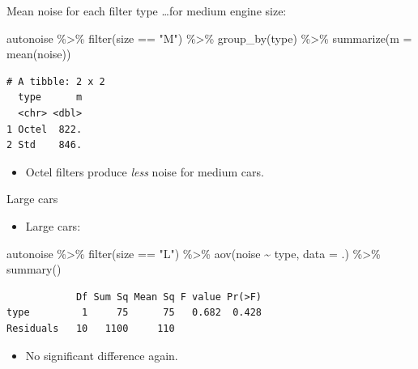 \documentclass[
  ignorenonframetext,
]{beamer}
\newenvironment{Shaded}{\begin{snugshade}}{\end{snugshade}}
\newcommand{\AttributeTok}[1]{\textcolor[rgb]{0.40,0.45,0.13}{#1}}
\newcommand{\FunctionTok}[1]{\textcolor[rgb]{0.28,0.35,0.67}{#1}}
\newcommand{\NormalTok}[1]{\textcolor[rgb]{0.00,0.23,0.31}{#1}}
\newcommand{\SpecialCharTok}[1]{\textcolor[rgb]{0.37,0.37,0.37}{#1}}
\newcommand{\StringTok}[1]{\textcolor[rgb]{0.13,0.47,0.30}{#1}}
\providecommand{\tightlist}{%
  \setlength{\itemsep}{0pt}\setlength{\parskip}{0pt}}\usepackage{longtable,booktabs,array}
\begin{document}
\begin{frame}[fragile]{Mean noise for each filter type}
\protect\hypertarget{mean-noise-for-each-filter-type}{}
\ldots for medium engine size:

\begin{Shaded}
\begin{Highlighting}[]
\NormalTok{autonoise }\SpecialCharTok{\%\textgreater{}\%}
  \FunctionTok{filter}\NormalTok{(size }\SpecialCharTok{==} \StringTok{"M"}\NormalTok{) }\SpecialCharTok{\%\textgreater{}\%}
  \FunctionTok{group\_by}\NormalTok{(type) }\SpecialCharTok{\%\textgreater{}\%}
  \FunctionTok{summarize}\NormalTok{(}\AttributeTok{m =} \FunctionTok{mean}\NormalTok{(noise))}
\end{Highlighting}
\end{Shaded}

\begin{verbatim}
# A tibble: 2 x 2
  type      m
  <chr> <dbl>
1 Octel  822.
2 Std    846.
\end{verbatim}

\begin{itemize}
\tightlist
\item
  Octel filters produce \emph{less} noise for medium cars.
\end{itemize}
\end{frame}

\begin{frame}[fragile]{Large cars}
\protect\hypertarget{large-cars}{}
\begin{itemize}
\tightlist
\item
  Large cars:
\end{itemize}

\begin{Shaded}
\begin{Highlighting}[]
\NormalTok{autonoise }\SpecialCharTok{\%\textgreater{}\%}
  \FunctionTok{filter}\NormalTok{(size }\SpecialCharTok{==} \StringTok{"L"}\NormalTok{) }\SpecialCharTok{\%\textgreater{}\%}
  \FunctionTok{aov}\NormalTok{(noise }\SpecialCharTok{\textasciitilde{}}\NormalTok{ type, }\AttributeTok{data =}\NormalTok{ .) }\SpecialCharTok{\%\textgreater{}\%}
  \FunctionTok{summary}\NormalTok{()}
\end{Highlighting}
\end{Shaded}

\begin{verbatim}
            Df Sum Sq Mean Sq F value Pr(>F)
type         1     75      75   0.682  0.428
Residuals   10   1100     110               
\end{verbatim}

\begin{itemize}
\tightlist
\item
  No significant difference again.
\end{itemize}
\end{frame}
\end{document}
